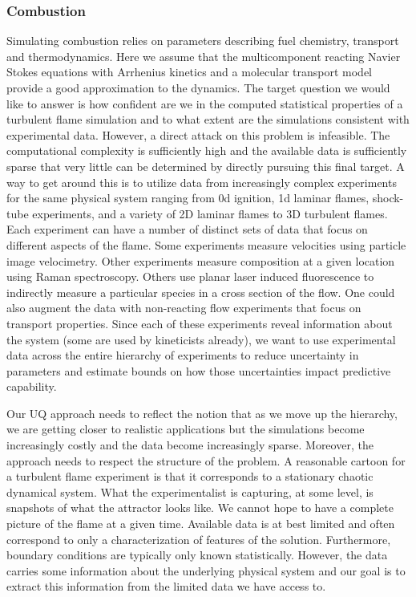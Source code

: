 \documentclass[11pt]{article}
\begin{document}
\subsubsection*{Combustion}
Simulating combustion relies on parameters
describing fuel  chemistry, transport and thermodynamics.
Here we assume that the multicomponent reacting Navier Stokes equations with Arrhenius
kinetics and a molecular transport model provide a good approximation to the dynamics.
The target question we would like to answer is how confident are we in the computed statistical
properties of a turbulent flame simulation and to what extent are the simulations consistent
with experimental data.
However, a direct attack on this problem is infeasible.
The computational complexity is sufficiently high and the available data is sufficiently
sparse that very little can be determined by directly pursuing this final target.
A way to get around this is to utilize
data from increasingly complex experiments for the same physical
system ranging from 0d ignition, 1d laminar flames, shock-tube experiments,
and
a variety of 2D laminar flames to 3D turbulent flames.
Each experiment can have a number of distinct sets of data that focus on different
aspects of the flame.
Some experiments measure velocities using particle image velocimetry. Other experiments
measure composition at a given location using Raman spectroscopy. Others use planar laser induced
fluorescence to indirectly measure a particular species in a cross section of the flow.
One could also augment the data with non-reacting flow experiments that focus on transport properties.
Since each of these experiments reveal information about the system (some are used by kineticists already), we want
to use experimental data across the entire hierarchy of experiments to reduce uncertainty in parameters and estimate bounds on how those uncertainties impact predictive capability.

Our UQ approach needs to reflect the notion that as we move up the hierarchy, we are
getting closer to realistic applications but the simulations become
increasingly costly and the data become increasingly sparse.
Moreover, the approach needs to respect the structure of the problem.
A reasonable cartoon for a 
turbulent flame experiment is that it corresponds to a stationary chaotic dynamical system.
What the experimentalist is capturing, at some level, is
snapshots of what the attractor looks like.
We cannot hope to have a complete picture of the flame at a given time. Available data is at best limited and
often correspond to only a characterization of features of the solution. Furthermore, boundary conditions are typically only known
statistically.
However, the data carries some information about the underlying physical system and our goal is to extract this information from the limited data we have access to.
\end{document}
